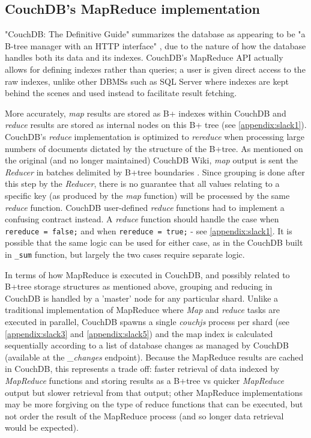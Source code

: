 \subsection{CouchDB's MapReduce implementation}
"CouchDB: The Definitive Guide" summarizes the database as appearing to be "a B-tree manager with an HTTP interface" \cite{couchguide}, due to the nature of how the database handles both its data and its indexes. CouchDB's MapReduce API actually allows for defining indexes rather than queries; a user is given direct access to the raw indexes, unlike other DBMSs such as SQL Server where indexes are kept behind the scenes and used instead to facilitate result fetching.

More accurately, \textit{map} results are stored as B+ indexes within CouchDB and \textit{reduce} results are stored as internal nodes on this B+ tree (see \ref{appendix:slack1}). CouchDB's \textit{reduce} implementation is optimized to \textit{rereduce} when processing large numbers of documents dictated by the structure of the B+tree. As mentioned on the original (and no longer maintained) CouchDB Wiki, \textit{map} output is sent the \textit{Reducer} in batches delimited by B+tree boundaries \cite{couchwiki}. Since grouping is done after this step by the \textit{Reducer}, there is no guarantee that all values relating to a specific key (as produced by the \textit{map} function) will be processed by the same \textit{reduce} function. CouchDB user-defined \textit{reduce} functions had to implement a confusing contract instead. A \textit{reduce} function should handle the case when \texttt{rereduce = false;} and when \texttt{rereduce = true;} - see \ref{appendix:slack1}. It is possible that the same logic can be used for either case, as in the CouchDB built in \texttt{_sum} function, but largely the two cases require separate logic.

In terms of how MapReduce is executed in CouchDB, and possibly related to B+tree storage structures as mentioned above, grouping and reducing in CouchDB is handled by a 'master' node for any particular shard. Unlike a traditional implementation of MapReduce where \textit{Map} and \textit{reduce} tasks are executed in parallel, CouchDB spawns a single \textit{couchjs} process per shard (see \ref{appendix:slack3} and \ref{appendix:slack5}) and the map index is calculated sequentially according to a list of database changes as managed by CouchDB (available at the \textit{\_changes} endpoint).
Because the MapReduce results are cached in CouchDB, this represents a trade off: faster retrieval of data indexed by \textit{MapReduce} functions and storing results as a B+tree vs quicker \textit{MapReduce} output but slower retrieval from that output; other MapReduce implementations may be more forgiving on the type of reduce functions that can be executed, but not order the result of the MapReduce process (and so longer data retrieval would be expected).

